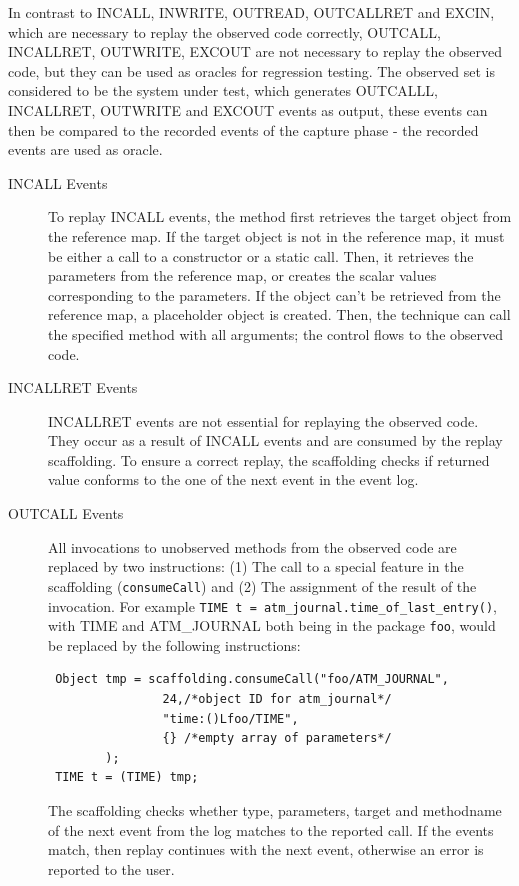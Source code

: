 In contrast to INCALL, INWRITE, OUTREAD, OUTCALLRET and EXCIN, which are necessary to replay the observed code correctly, OUTCALL, INCALLRET, OUTWRITE, EXCOUT are not necessary to replay the observed code, but they can be used as oracles for regression testing. The observed set is considered to be the system under test, which generates OUTCALLL, INCALLRET, OUTWRITE and EXCOUT events as output, these events can then be compared to the recorded events of the capture phase - the recorded events are used as oracle.

\begin{description}
 \item [INCALL Events] To replay INCALL events, the method first retrieves the target object from the reference map. If the target object is not in the reference map, it must be either a call to a constructor or a static call. Then, it retrieves the parameters from the reference map, or creates the scalar values corresponding to the parameters. If the object can't be retrieved from the reference map, a placeholder object is created. Then, the technique can call the specified method with all arguments; the control flows to the observed code. 
 \item [INCALLRET Events] INCALLRET events are not essential for replaying the observed code. They occur as a result of INCALL events and are consumed by the replay scaffolding. To ensure a correct replay, the scaffolding checks if returned value conforms to the one of the next event in the event log.
 \item [OUTCALL Events] All invocations to unobserved methods from the observed code are replaced by two instructions: (1) The call to a special feature in the scaffolding (\texttt{consumeCall}) and (2) The assignment of the result of the invocation. For example \texttt{TIME t = atm\_journal.time\_of\_last\_entry()}, with TIME and ATM\_JOURNAL both being in the package \texttt{foo}, would be replaced by the following instructions:
\begin{lstlisting}
 Object tmp = scaffolding.consumeCall("foo/ATM_JOURNAL",
                24,/*object ID for atm_journal*/
                "time:()Lfoo/TIME",
                {} /*empty array of parameters*/
		);
 TIME t = (TIME) tmp;
\end{lstlisting}
The scaffolding checks whether type, parameters, target and methodname of the next event from the log matches to the reported call. If the events match, then replay continues with the next event, otherwise an error is reported to the user.

\end{description}
